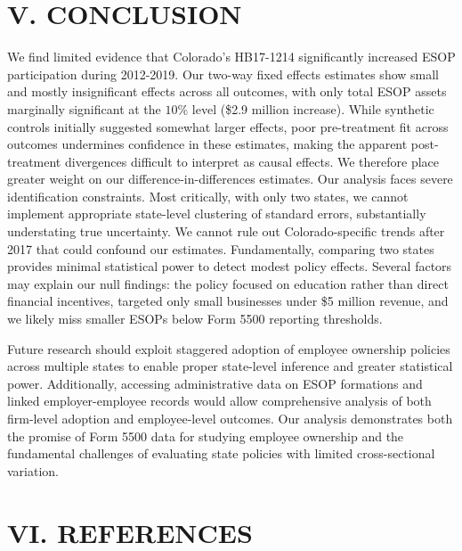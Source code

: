 \documentclass[12pt]{article}
\renewcommand{\normalsize}{\fontsize{12pt}{14pt}\selectfont}
\begin{document}
\section*{\centering \normalsize \textbf{V. CONCLUSION}}

\vspace{12pt}

We find limited evidence that Colorado's HB17-1214 significantly increased ESOP participation during 2012-2019. Our two-way fixed effects estimates show small and mostly insignificant effects across all outcomes, with only total ESOP assets marginally significant at the $10\%$ level (\$2.9 million increase). While synthetic controls initially suggested somewhat larger effects, poor pre-treatment fit across outcomes undermines confidence in these estimates, making the apparent post-treatment divergences difficult to interpret as causal effects. We therefore place greater weight on our difference-in-differences estimates.
Our analysis faces severe identification constraints. Most critically, with only two states, we cannot implement appropriate state-level clustering of standard errors, substantially understating true uncertainty. We cannot rule out Colorado-specific trends after 2017 that could confound our estimates. Fundamentally, comparing two states provides minimal statistical power to detect modest policy effects. Several factors may explain our null findings: the policy focused on education rather than direct financial incentives, targeted only small businesses under \$5 million revenue, and we likely miss smaller ESOPs below Form 5500 reporting thresholds.

Future research should exploit staggered adoption of employee ownership policies across multiple states to enable proper state-level inference and greater statistical power. Additionally, accessing administrative data on ESOP formations and linked employer-employee records would allow comprehensive analysis of both firm-level adoption and employee-level outcomes. Our analysis demonstrates both the promise of Form 5500 data for studying employee ownership and the fundamental challenges of evaluating state policies with limited cross-sectional variation.



\section*{\centering \normalsize \textbf{VI. REFERENCES}}
\renewcommand{\bibsection}{}

\nocite{*}

\end{document}
